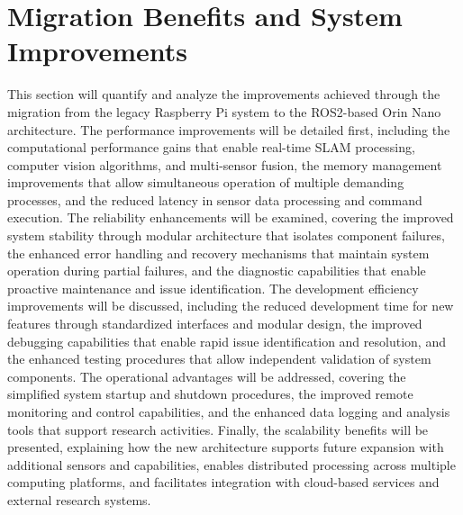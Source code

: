 \section{Migration Benefits and System Improvements}
This section will quantify and analyze the improvements achieved through the migration from the legacy Raspberry Pi system to the ROS2-based Orin Nano architecture. The performance improvements will be detailed first, including the computational performance gains that enable real-time SLAM processing, computer vision algorithms, and multi-sensor fusion, the memory management improvements that allow simultaneous operation of multiple demanding processes, and the reduced latency in sensor data processing and command execution. The reliability enhancements will be examined, covering the improved system stability through modular architecture that isolates component failures, the enhanced error handling and recovery mechanisms that maintain system operation during partial failures, and the diagnostic capabilities that enable proactive maintenance and issue identification. The development efficiency improvements will be discussed, including the reduced development time for new features through standardized interfaces and modular design, the improved debugging capabilities that enable rapid issue identification and resolution, and the enhanced testing procedures that allow independent validation of system components. The operational advantages will be addressed, covering the simplified system startup and shutdown procedures, the improved remote monitoring and control capabilities, and the enhanced data logging and analysis tools that support research activities. Finally, the scalability benefits will be presented, explaining how the new architecture supports future expansion with additional sensors and capabilities, enables distributed processing across multiple computing platforms, and facilitates integration with cloud-based services and external research systems.
